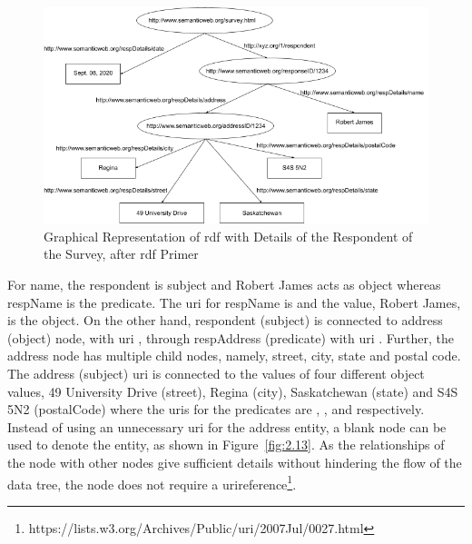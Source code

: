 \begin{doublespace}
\begin{figure}[htp]
    \includegraphics[width=15cm]{images/ch2/Figure12.png}
    \caption{Graphical Representation of \ac{rdf} with Details of the Respondent of the Survey, after \ac{rdf} Primer~\cite{manola2004rdf}}
    \label{fig:2.12}
\end{figure}
\par For name, the respondent is subject and Robert James acts as object whereas respName is the predicate. The \ac{uri} for respName is  and the value, Robert James, is the object. On the other hand, respondent (subject) is connected to address (object) node, with \ac{uri} , through respAddress (predicate) with \ac{uri} . Further, the address node has multiple child nodes, namely, street, city, state and postal code. The address (subject) \ac{uri} is connected to the values of four different object values, 49 University Drive (street), Regina (city), Saskatchewan (state) and S4S 5N2 (postalCode) where the \ac{uri}s for the predicates are , ,  and  respectively. Instead of using an unnecessary \ac{uri} for the address entity, a blank node can be used to denote the entity, as shown in Figure~\ref{fig:2.13}. As the relationships of the node with other nodes give sufficient details without hindering the flow of the data tree, the node does not require a \ac{uri}reference\footnote{https://lists.w3.org/Archives/Public/uri/2007Jul/0027.html}.

\end{doublespace}
